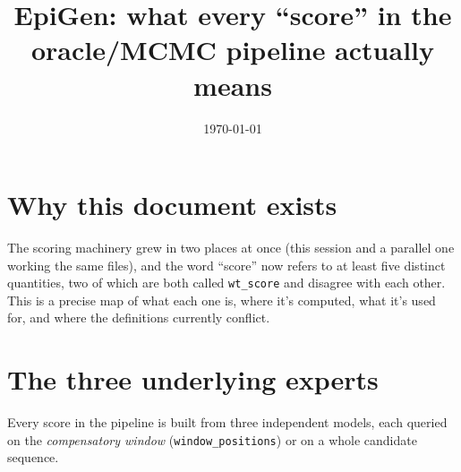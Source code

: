 \documentclass[11pt]{article}
\title{EpiGen: what every ``score'' in the oracle/MCMC pipeline actually means}
\author{}
\date{\today}
\begin{document}
\maketitle

\section*{Why this document exists}

The scoring machinery grew in two places at once (this session and a parallel
one working the same files), and the word ``score'' now refers to at least
five distinct quantities, two of which are both called \texttt{wt\_score} and
disagree with each other. This is a precise map of what each one is, where
it's computed, what it's used for, and where the definitions currently
conflict.

\tableofcontents

\section{The three underlying experts}

Every score in the pipeline is built from three independent models, each
queried on the \emph{compensatory window} (\texttt{window\_positions}) or on
a whole candidate sequence.
\end{document}
